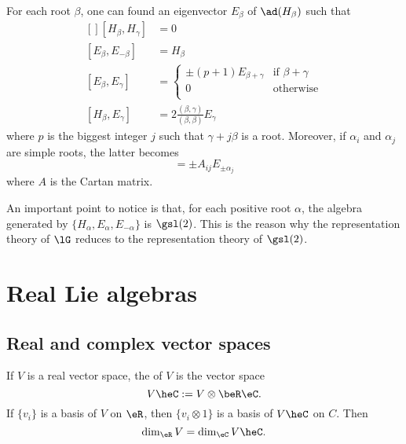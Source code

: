 \begin{theorem}
    For each root $\beta$, one can found an eigenvector $E_{\beta}$ of $\ad(H_{\beta})$ such that
    \begin{equation}            \label{EqChevalleyBasis}
        \begin{aligned}[]
            [H_{\beta},H_{\gamma}]      &=  0\\
            [E_{\beta},E_{-\beta}]      &=  H_{\beta}\\
            [E_{\beta},E_{\gamma}]      &=
                                \begin{cases}
                                    \pm(p+1)E_{\beta+\gamma}    &\text{if }\beta+\gamma\\
                                    0               &\text{otherwise}\\
                                \end{cases}\\
            [H_{\beta},E_{\gamma}]      &=2\frac{ (\beta,\gamma) }{ (\beta,\beta) }E_{\gamma}
        \end{aligned}
    \end{equation}
    where $p$ is the biggest integer $j$ such that $\gamma+j\beta$ is a root. Moreover, if $\alpha_i$ and $\alpha_j$ are simple roots, the latter becomes
    \begin{equation}
        [H_{\alpha_i},E_{\pm\alpha_j}]=\pm A_{ij}E_{\pm\alpha_j}
    \end{equation}
    where $A$ is the Cartan matrix.
\end{theorem}

An important point to notice is that, for each positive root $\alpha$, the algebra generated by $\{ H_{\alpha},E_{\alpha},E_{-\alpha} \}$ is $\gsl(2)$. This is the reason why the representation theory of $\lG$ reduces to the representation theory of $\gsl(2)$.

\section{Real Lie algebras}

\subsection{Real and complex vector spaces}

If $V$ is a real vector space, the  of $V$ is the vector space
\[
  V\heC:=V\otimes\beR\eC.
\]
If $\{v_i\}$ is a basis of $V$ on $\eR$, then $\{v_i\otimes 1\}$ is a basis of $V\heC$ on $C$. Then
\[
   \dim_{\eR}V=\dim_{\eC}V\heC.
\]

